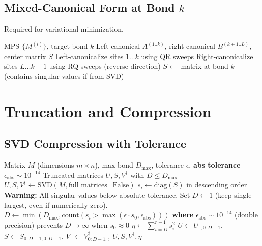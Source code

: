 \documentclass[aps,prb,onecolumn,scriptaddress]{revtex4-2}
\newcommand{\eps}{\epsilon}
\begin{document}
	
	\subsection{Mixed-Canonical Form at Bond $k$}
	Required for variational minimization.
	
	\begin{algorithm}[H]
		\caption{BringToBond\\
			\textit{Numerical Note:} RQ decomposition (used for right-canonicalization) is less stable than QR and may not be available in all libraries (e.g., PyTorch). Alternative: Reverse the site order, apply \textsc{LeftCanonicalize}, then reverse back.}
		\begin{algorithmic}[1]
			\Require MPS $\{M^{(i)}\}$, target bond $k$
			\Ensure Left-canonical $A^{(1..k)}$, right-canonical $B^{(k+1..L)}$, center matrix $S$
			\State Left-canonicalize sites $1 \dots k$ using QR sweeps
			\State Right-canonicalize sites $L \dots k+1$ using RQ sweeps (reverse direction)
			\State $S \gets$ matrix at bond $k$ (contains singular values if from SVD)
		\end{algorithmic}
	\end{algorithm}
	
	\section{Truncation and Compression}
	
	\subsection{SVD Compression with Tolerance}
	\begin{algorithm}[H]
		\caption{TruncateBond}
		\begin{algorithmic}[1]
			\Require Matrix $M$ (dimensions $m \times n$), max bond $D_{\max}$, tolerance $\eps$, \textbf{abs tolerance $\eps_{\text{abs}} \sim 10^{-14}$}
			\Ensure Truncated matrices $U, S, V^\dagger$ with $D \leq D_{\max}$
			\State $U, S, V^\dagger \gets \text{SVD}(M, \text{full\_matrices=False})$
			\State $s_i \gets \text{diag}(S)$ in descending order
			\State {}
			\State {}
			\If{$s_0 < \eps_{\text{abs}}$}
			\State \textbf{Warning:} All singular values below absolute tolerance.
			\State Set $D \gets 1$ (keep single largest, even if numerically zero).
			\Else
			\State $D \gets \min\left(D_{\max}, \text{count}\left(s_i > \max\left(\eps \cdot s_0, \eps_{\text{abs}}\right)\right)\right)$
			\State \textbf{where} $\eps_{\text{abs}} \sim 10^{-14}$ (double precision) prevents $D \to \infty$ when $s_0 \approx 0$
			\EndIf
			\State {}
			\State $\eta \gets \sum_{i=D}^{r-1} s_i^2$ 
			\State $U \gets U_{:,0:D-1}$, $S \gets S_{0:D-1,0:D-1}$, $V^\dagger \gets V^\dagger_{0:D-1,:}$
			\State \Return $U, S, V^\dagger, \eta$
		\end{algorithmic}
	\end{algorithm}
	
\end{document}
